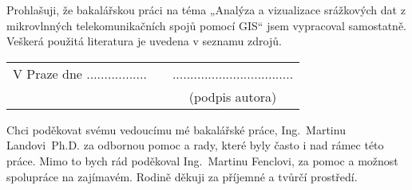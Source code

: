 \newcommand{\odsaditodzhora}{\hskip1pt\vfill}

\odsaditodzhora
{}

 \baselineskip

Prohlašuji, že bakalářskou práci na téma „Analýza a vizualizace
srážkových dat z mikrovlnných telekomunikačních spojů pomocí GIS“ jsem
vypracoval samostatně. Veškerá použitá literatura je uvedena v seznamu
zdrojů.

\begin{flushleft}
\begin{tabular}{cp{}c}
V Praze dne .................
& 
&
..................................
\\
&&
(podpis autora)
\end{tabular}

\end{flushleft}
\newpage

\odsaditodzhora
{}

 \baselineskip

Chci poděkovat svému vedoucímu mé bakalářské práce, Ing.~Martinu
Landovi~Ph.D. za odbornou pomoc a rady, které byly často i nad rámec
této práce. Mimo to bych rád poděkoval Ing.~Martinu Fenclovi, za pomoc
a možnost spolupráce na zajímavém. Rodině děkuji za příjemné a tvůrčí
prostředí.

\newpage

